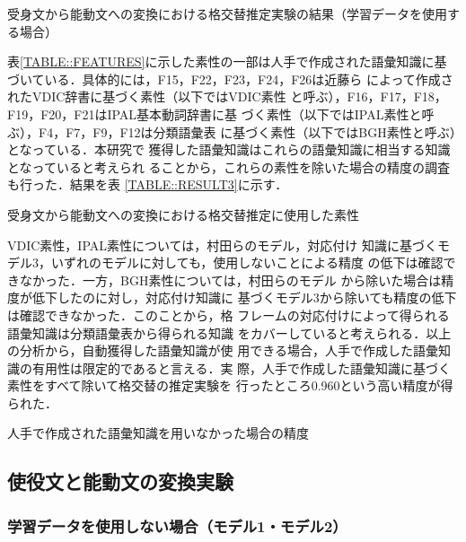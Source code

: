 \documentclass[japanese]{jnlp_1.4}
\begin{document}
  \begin{table}[b]
   \caption{受身文から能動文への変換における格交替推定実験の結果（学習データを使用する場合）}
\label{TABLE::RESULT2}

  \end{table}

  表\ref{TABLE::FEATURES}に示した素性の一部は人手で作成された語彙知識に基
  づいている．具体的には，F15，F22，F23，F24，F26は近藤ら
  \cite{Kondo2001}によって作成されたVDIC辞書に基づく素性（以下ではVDIC素性
  と呼ぶ），F16，F17，F18，F19，F20，F21はIPAL基本動詞辞書\cite{IPAL}に基
  づく素性（以下ではIPAL素性と呼ぶ），F4，F7，F9，F12は分類語彙表
  \cite{BGH1964}に基づく素性（以下ではBGH素性と呼ぶ）となっている．本研究で
  獲得した語彙知識はこれらの語彙知識に相当する知識となっていると考えられ
  ることから，これらの素性を除いた場合の精度の調査も行った．結果を表
  \ref{TABLE::RESULT3}に示す．

  \begin{table}[t]
   \caption{受身文から能動文への変換における格交替推定に使用した素性}
   \label{TABLE::FEATURES}

  \end{table}

  VDIC素性，IPAL素性については，村田らのモデル\cite{Murata2008}，対応付け
  知識に基づくモデル3，いずれのモデルに対しても，使用しないことによる精度
  の低下は確認できなかった．一方，BGH素性については，村田らのモデル
  \cite{Murata2008}から除いた場合は精度が低下したのに対し，対応付け知識に
  基づくモデル3から除いても精度の低下は確認できなかった．このことから，格
  フレームの対応付けによって得られる語彙知識は分類語彙表から得られる知識
  をカバーしていると考えられる．以上の分析から，自動獲得した語彙知識が使
  用できる場合，人手で作成した語彙知識の有用性は限定的であると言える．実
  際，人手で作成した語彙知識に基づく素性をすべて除いて格交替の推定実験を
  行ったところ0.960という高い精度が得られた．

  \begin{table}[b]
   \caption{人手で作成された語彙知識を用いなかった場合の精度}
\label{TABLE::RESULT3}

  \end{table}


  \subsection{使役文と能動文の変換実験}

   \subsubsection{学習データを使用しない場合（モデル1・モデル2）}
\end{document}
